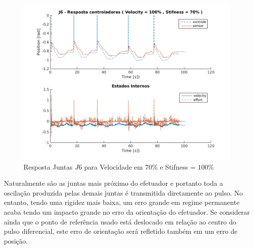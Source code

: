 \vspace{1cm}

\begin{figure}[H]
    \centering
    \includegraphics[width=0.6\linewidth,trim={2cm 1cm 2cm 2cm}]{tex/figs/squareStiffJ9stateEval_J6v100s70.png}
    \caption{Resposta Juntas $J6$ para Velocidade em $70\%$ e Stifness = $100\%$ }
    \label{fig:squareStiffJ9stateEval_J6v100s70}
\end{figure}

Naturalmente são as juntas mais próximo do efetuador e portanto toda a oscilação produzida pelas demais juntas é transmitida diretamente ao pulso. No entanto, tendo uma rigidez mais baixa, um erro grande em regime permanente acaba tendo um impacto grande no erro da orientação do efetuador. Se considerar ainda que o ponto de referência usado está deslocado em relação ao centro do pulso diferencial, este erro de orientação será refletido também em um erro de posição.

